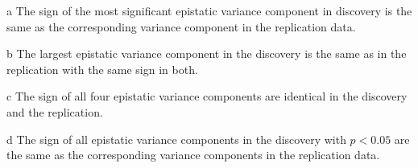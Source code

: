 \documentclass{article}
\begin{document}
\begin{table}[ht]
\begin{threeparttable}
\begin{tablenotes}
\item[a] The sign of the most significant epistatic variance component in discovery is the same as the corresponding variance component in the replication data.
\item[b] The largest epistatic variance component in the discovery is the same as in the replication with the same sign in both.
\item[c] The sign of all four epistatic variance components are identical in the discovery and the replication.
\item[d] The sign of all epistatic variance components in the discovery with $p < 0.05$ are the same as the corresponding variance components in the replication data.
\end{tablenotes}

\end{threeparttable}
\end{table}
\end{document}
